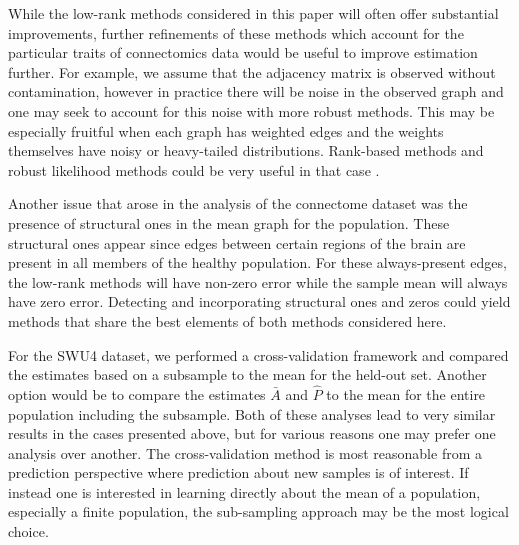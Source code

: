\documentclass[journal,twoside,web]{ieeecolor}
\begin{document}

While the low-rank methods considered in this paper will often offer substantial improvements, further refinements of these methods which account for the particular traits of connectomics data would be useful to improve estimation further.
For example, we assume that the adjacency matrix is observed without contamination, however in practice there will be noise in the observed graph and one may seek to account for this noise with more robust methods.
This may be especially fruitful when each graph has weighted edges and the weights themselves have noisy or heavy-tailed distributions.
Rank-based methods and robust likelihood methods could be very useful in that case \cite{huber2009robust,qin2013maximum}.


Another issue that arose in the analysis of the connectome dataset was the presence of structural ones in the mean graph for the population.
These structural ones appear since edges between certain regions of the brain are present in all members of the healthy population.
For these always-present edges, the low-rank methods will have non-zero error while the sample mean will always have zero error.
Detecting and incorporating structural ones and zeros could yield methods that share the best elements of both methods considered here.

For the SWU4 dataset, we performed a cross-validation framework and compared the estimates based on a subsample to the mean for the held-out set.
Another option would be to compare the estimates $\bar{A}$ and $\hat{P}$ to the mean for the entire population including the subsample.
Both of these analyses lead to very similar results in the cases presented above, but for various reasons one may prefer one analysis over another.
The cross-validation method is most reasonable from a prediction perspective where prediction about new samples is of interest.
If instead one is interested in learning directly about the mean of a population, especially a finite population, the sub-sampling approach may be the most logical choice.
\end{document}
